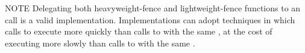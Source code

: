 NOTE Delegating both heavyweight-fence and lightweight-fence functions to an
 call is a valid implementation. Implementations can adopt
techniques in which calls to  execute more quickly than calls
to  with the same , at the cost of
 executing more slowly than calls to
 with the same .


